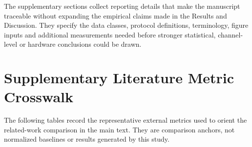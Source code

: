 \documentclass[11pt]{article}
\begin{document}
The supplementary sections collect reporting details that make the manuscript
traceable without expanding the empirical claims made in the Results and
Discussion.  They specify the data classes, protocol definitions, terminology,
figure inputs and additional measurements needed before stronger statistical,
channel-level or hardware conclusions could be drawn.

\section{Supplementary Literature Metric Crosswalk}

The following tables record the representative external metrics used to orient
the related-work comparison in the main text.  They are comparison anchors, not
normalized baselines or results generated by this study.
\end{document}
